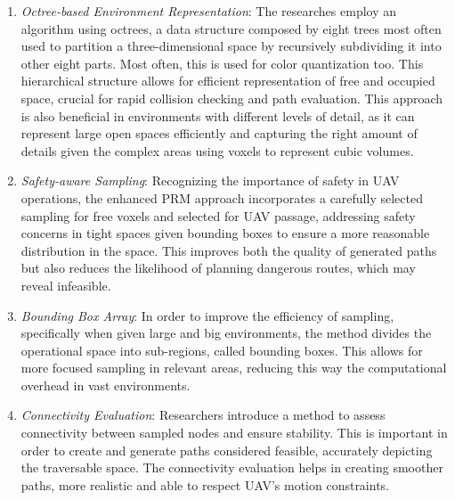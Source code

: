 \documentclass[conference]{IEEEtran}
\begin{document}
\begin{enumerate}
    \item \textit{Octree-based Environment Representation}: The researches employ an algorithm using octrees, a data structure composed by eight trees most often used to partition a three-dimensional space by recursively subdividing it into other eight parts. Most often, this is used for color quantization too. This hierarchical structure allows for efficient representation of free and occupied space, crucial for rapid collision checking and path evaluation. This approach is also beneficial in environments with different levels of detail, as it can represent large open spaces efficiently and capturing the right amount of details given the complex areas using voxels to represent cubic volumes.

    \item \textit{Safety-aware Sampling}: Recognizing the importance of safety in UAV operations, the enhanced PRM approach incorporates a carefully selected sampling for free voxels and selected for UAV passage, addressing safety concerns in tight spaces given bounding boxes to ensure a more reasonable distribution in the space. This improves both the quality of generated paths but also reduces the likelihood of planning dangerous routes, which may reveal infeasible.

    \item \textit{Bounding Box Array}: In order to improve the efficiency of sampling, specifically when given large and big environments, the method divides the operational space into sub-regions, called bounding boxes. This allows for more focused sampling in relevant areas, reducing this way the computational overhead in vast environments.

    \item \textit{Connectivity Evaluation}: Researchers introduce a method to assess connectivity between sampled nodes and ensure stability. This is important in order to create and generate paths considered feasible, accurately depicting the traversable space. The connectivity evaluation helps in creating smoother paths, more realistic and able to respect UAV's motion constraints.
    
\end{enumerate}
\end{document}
